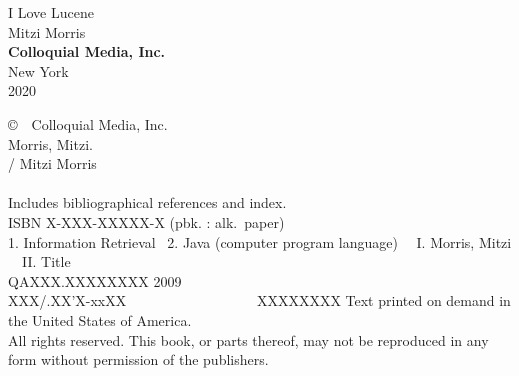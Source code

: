 \documentclass[11pt]{book}
\begin{document}
\setcounter{chapter}{0}
\setcounter{section}{0}
\pagestyle{empty}

\cleardoublepage
\vspace*{1.125in}
\begin{center}
{\hfill {\fontsize{60}{70}\selectfont I Love Lucene}}
\\[0.75in]
{\hfill {\Huge Mitzi Morris}}
\\[-1pt]
\vfill
{\hfill {\large\bf Colloquial Media, Inc.}}
\\[1pt]
{\hfill {\small New York}}
\\[-1pt]
{\hfill {\small 2020}}
\end{center}

\clearpage
\vspace*{1.25in}
\noindent
{\footnotesize%
\copyright \ \ Colloquial Media, Inc.
\hfill
\vfill
\vfill
{}
\\[6pt]
Morris, Mitzi.
\\
\hspace*{0.125in}{\it I Love Lucene} / Mitzi Morris
\\
\hspace*{.5in}{p. cm.}
\\
\hspace*{0.125in}Includes bibliographical references and index.
\\
\hspace*{0.125in}ISBN X-XXX-XXXXX-X (pbk. : alk.~paper)
\\[4pt]
1. Information Retrieval  \ 2. Java (computer program language) \ \ I. Morris, Mitzi \ \ II. Title
\\[2pt]
\hspace*{0.125in}QAXXX.XXXXXXXX 2009
\\[2pt]
\hspace*{0.125in}XXX/.XX'X-xxXX      \ \ \ \ \ \ \ \ \ \ \ \ \ \ \ \ \  \ XXXXXXXX
\vfill
\noindent
Text printed on demand in the United States of America.
\\[12pt]
All rights reserved. This book, or parts thereof, may not
be reproduced in any form without permission of the publishers.
}


\newcommand{\bookname}{I Love Lucene}
\newcommand{\booknamecaps}{I LOVE LUCENE}
\end{document}
